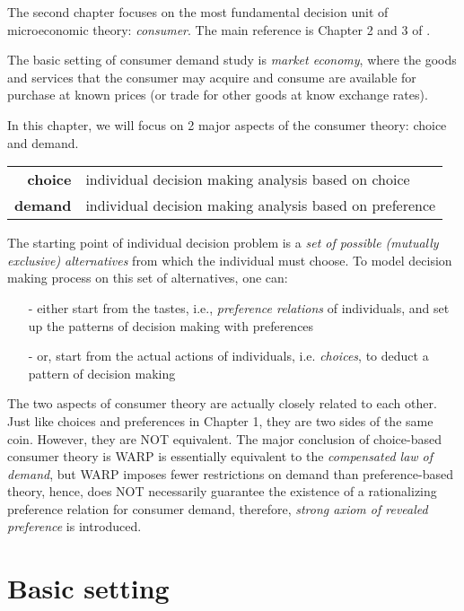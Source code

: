 \minitoc

\vspace{0.5cm}
The second chapter focuses on the most fundamental decision unit of microeconomic theory: \textit{consumer}. The main reference is Chapter 2 and 3 of \citet{mas1995microeconomic}.

The basic setting of consumer demand study is \textit{market economy}, where the goods and services that the consumer may acquire and consume are available for purchase at known prices (or trade for other goods at know exchange rates).

In this chapter, we will focus on 2 major aspects of the consumer theory: choice and demand.
\begin{center}
    \begin{tabular}{rl}
    \hline
    \textbf{choice} & individual decision making analysis based on choice\\ 
    \textbf{demand} & individual decision making analysis based on preference \\ 
    \hline
    \end{tabular}
\end{center}

The starting point of individual decision problem is a \textit{set of possible (mutually exclusive) alternatives} from which the individual must choose. To model decision making process
on this set of alternatives, one can:
\begin{enumerate}
    \item[-] either start from the tastes, i.e., \textit{preference relations} of individuals, and set up the patterns of decision making with preferences
    \item[-] or, start from the actual actions of individuals, i.e. \textit{choices}, to deduct a pattern of decision making
\end{enumerate}

The two aspects of consumer theory are actually closely related to each other. Just like choices and preferences in Chapter 1, they are two sides of the same coin. However, they are NOT equivalent.
The major conclusion of choice-based consumer theory is WARP is essentially equivalent to the \textit{compensated law of demand}, but WARP imposes fewer restrictions on demand than preference-based theory,
hence, does NOT necessarily guarantee the existence of a rationalizing preference relation for consumer demand, therefore, \textit{strong axiom of revealed preference} is introduced.

\section{Basic setting}\label{chap2:sec1}



